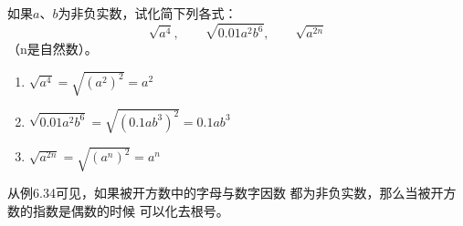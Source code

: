 \begin{example}
    如果$a$、$b$为非负实数，试化简下列各式：
\[\sqrt{a^4},\qquad \sqrt{0.01a^2b^6},\qquad \sqrt{a^{2n}} \]
（n是自然数）。
\end{example}

\begin{solution}
\begin{enumerate}
    \item $\sqrt{a^4}=\sqrt{(a^2)^2}=a^2$
    \item $\sqrt{0.01a^2b^6}=\sqrt{(0.1ab^3)^2}=0.1ab^3$
    \item $\sqrt{a^{2n}}=\sqrt{(a^n)^2}=a^n$
\end{enumerate}
\end{solution}

从例6.34可见，如果被开方数中的字母与数字因数
都为非负实数，那么当被开方数的指数是偶数的时候
可以化去根号。

